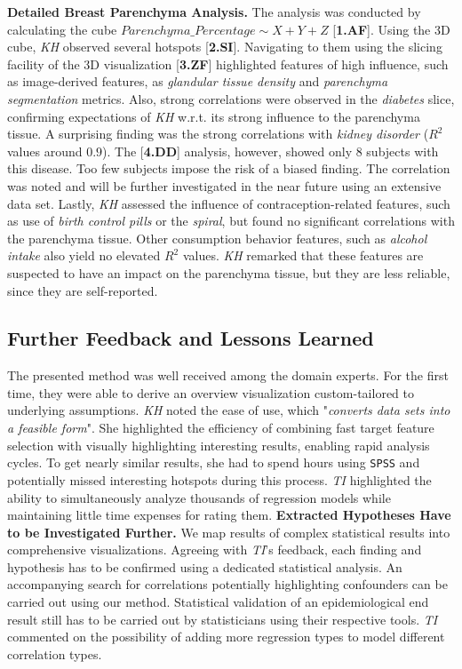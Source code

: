 \documentclass[journal]{style/vgtc} 			          %
\begin{document}
\textbf{Detailed Breast Parenchyma Analysis.}
The analysis was conducted by calculating the cube $Parenchyma\_Percentage \sim X + Y + Z$ [\textbf{1.AF}].
Using the 3D cube, \emph{KH} observed several hotspots [\textbf{2.SI}].
Navigating to them using the slicing facility of the 3D visualization [\textbf{3.ZF}] highlighted features of high influence, such as image-derived features, as \emph{glandular tissue density} and \emph{parenchyma segmentation} metrics.
Also, strong correlations were observed in the \emph{diabetes} slice, confirming expectations of \emph{KH} w.r.t. its strong influence to the parenchyma tissue.
A surprising finding was the strong correlations with \emph{kidney disorder} ($R^2$ values around $0.9$).
The [\textbf{4.DD}] analysis, however, showed only 8 subjects with this disease.
Too few subjects impose the risk of a biased finding.
The correlation was noted and will be further investigated in the near future using an extensive data set.
Lastly, \emph{KH} assessed the influence of contraception-related features, such as use of \emph{birth control pills} or the \emph{spiral}, but found no significant correlations with the parenchyma tissue.
Other consumption behavior features, such as \emph{alcohol intake} also yield no elevated $R^2$ values.
\emph{KH} remarked that these features are suspected to have an impact on the parenchyma tissue, but they are less reliable, since they are self-reported.
\subsection{Further Feedback and Lessons Learned} \label{Lessons Learned}
The presented method was well received among the domain experts.
For the first time, they were able to derive an overview visualization custom-tailored to underlying assumptions.
\emph{KH} noted the ease of use, which "\emph{converts data sets into a feasible form}".
She highlighted the efficiency of combining fast target feature selection with visually highlighting interesting results, enabling rapid analysis cycles.
To get nearly similar results, she had to spend hours using \texttt{SPSS} and potentially missed interesting hotspots during this process.
\emph{TI} highlighted the ability to simultaneously analyze thousands of regression models while maintaining little time expenses for rating them.
\textbf{Extracted Hypotheses Have to be Investigated Further.}
We map results of complex statistical results into comprehensive visualizations.
Agreeing with \emph{TI}'s feedback, each finding and hypothesis has to be confirmed using a dedicated statistical analysis.
An accompanying search for correlations potentially highlighting confounders can be carried out using our method.
Statistical validation of an epidemiological end result still has to be carried out by statisticians using their respective tools.
\emph{TI} commented on the possibility of adding more regression types to model different correlation types.%
\end{document}
